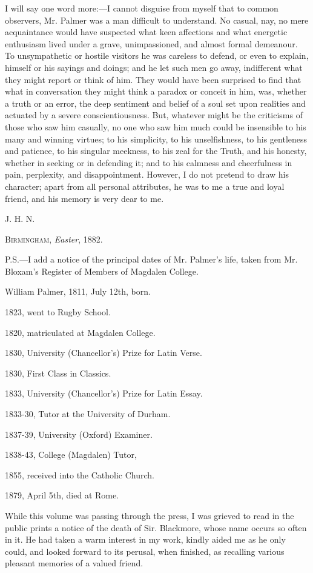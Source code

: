 I will say one word more:—I cannot disguise
from myself that to common observers, Mr. Palmer was a man difficult
to understand. No casual, nay, no mere acquaintance would have
suspected what keen affections and what energetic enthusiasm
lived under a grave, unimpassioned, and almost formal demeanour. To
unsympathetic or hostile visitors he was careless to defend, or even
to explain, himself or his sayings and doings; and he let such men go
away, indifferent what they might report or think of him. They would
have been surprised to find that what in conversation they might think
a paradox or conceit in him, was, whether a truth or an error, the
deep sentiment and belief of a soul set upon realities and actuated by
a severe conscientiousness. But, whatever might be the criticisms of
those who saw him casually, no one who saw him much could be
insensible to his many and winning virtues; to his simplicity, to his
unselfishness, to his gentleness and patience, to his singular
meekness, to his zeal for the Truth, and his honesty, whether in
seeking or in defending it; and to his calmness and cheerfulness in
pain, perplexity, and disappointment. However, I do not pretend to
draw his character; apart from all personal attributes, he was
to me a true and loyal friend, and his memory is very dear to me.

J. H. N.

B\textsc{irmingham}, \emph{Easter}, 1882.

P.S.—I add a notice of the principal dates of
Mr. Palmer's life, taken from Mr. Bloxam's Register of Members of
Magdalen College.

William Palmer, 1811, July 12th, born.

1823, went to Rugby School.

1820, matriculated at Magdalen College.

1830, University (Chancellor's) Prize for Latin Verse.

1830, First Class in Classics.

1833, University (Chancellor's) Prize for Latin Essay.

1833-30, Tutor at the University of Durham.

1837-39, University (Oxford) Examiner.

1838-43, College (Magdalen) Tutor,

1855, received into the Catholic Church.

1879, April 5th, died at Rome.

While this volume was passing through the press,
I was grieved to read in the public prints a notice of the death of
Sir. Blackmore, whose name occurs so often in it. He had taken a warm
interest in my work, kindly aided me as he only could, and looked
forward to its perusal, when finished, as recalling various pleasant
memories of a valued friend.
